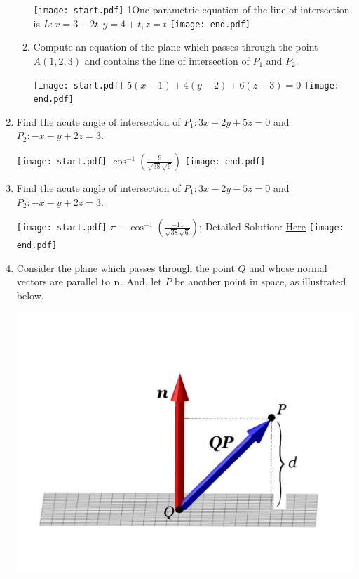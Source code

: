\documentclass[12pt]{article}
\begin{document}
\begin{enumerate}
\begin{enumerate}
\texttt{[image: start.pdf]}
{{{1\linewidth}{One parametric equation of the line of intersection is $L: x=3-2t, y=4+t, z=t$}}}
\texttt{[image: end.pdf]}


\item Compute an equation of the plane which passes through the point $A(1,2,3)$ and contains the line of intersection of $P_1$ and $P_2$.

\texttt{[image: start.pdf]}
{{$5(x-1)+4(y-2)+6(z-3)=0$}}
\texttt{[image: end.pdf]}


\end{enumerate}

\item Find the acute angle of intersection of $P_1: 3x-2y+5z=0$ and $P_2: -x-y+2z=3$.

\texttt{[image: start.pdf]}
{{$\cos^{-1}\left(\frac{9}{\sqrt{38}\sqrt{6}}\right)$}}
\texttt{[image: end.pdf]}


\item Find the acute angle of intersection of $P_1: 3x-2y-5z=0$ and $P_2: -x-y+2z=3$.

\texttt{[image: start.pdf]}
{{$\pi-\cos^{-1}\left(\frac{-11}{\sqrt{38}\sqrt{6}}\right)$; Detailed Solution: \textcolor{blue}{\href{http://www.math.drexel.edu/classes/Calculus/resources/Math200HW/Solutions/06_200_Planes_16.pdf}{Here}}}}
\texttt{[image: end.pdf]}


\item Consider the plane which passes through the point $Q$ and whose normal vectors are parallel to ${\bf n}$.  And, let $P$ be another point in space, as illustrated below.

\begin{center}
\includegraphics[scale=0.5]{distance.pdf}
\end{center}


\end{enumerate}
\end{document}
